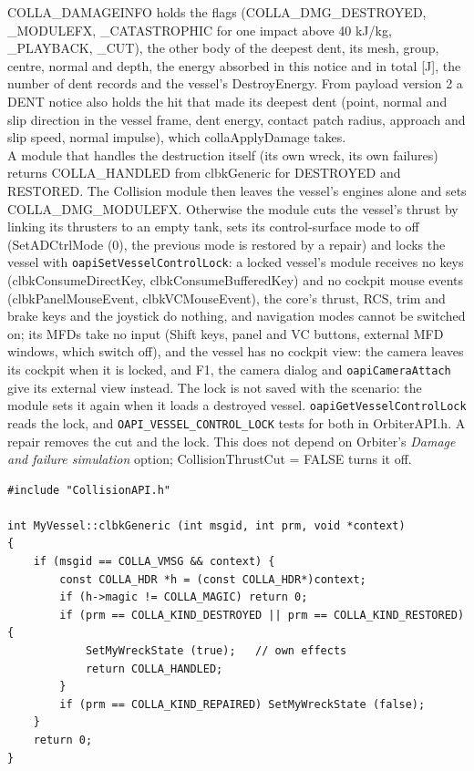 \documentclass[Orbiter Developer Manual.tex]{subfiles}
\begin{document}
\begin{sloppypar}
\noindent
COLLA\_DAMAGEINFO holds the flags (COLLA\_DMG\_DESTROYED, \_MODULEFX, \_CATASTROPHIC for one impact above 40 kJ/kg, \_PLAYBACK, \_CUT), the other body of the deepest dent, its mesh, group, centre, normal and depth, the energy absorbed in this notice and in total [J], the number of dent records and the vessel's DestroyEnergy. From payload version 2 a DENT notice also holds the hit that made its deepest dent (point, normal and slip direction in the vessel frame, dent energy, contact patch radius, approach and slip speed, normal impulse), which collaApplyDamage takes.\\
A module that handles the destruction itself (its own wreck, its own failures) returns COLLA\_HANDLED from clbkGeneric for DESTROYED and RESTORED. The Collision module then leaves the vessel's engines alone and sets COLLA\_DMG\_MODULEFX. Otherwise the module cuts the vessel's thrust by linking its thrusters to an empty tank, sets its control-surface mode to off (SetADCtrlMode (0), the previous mode is restored by a repair) and locks the vessel with \texttt{oapiSetVesselControlLock}: a locked vessel's module receives no keys (clbkConsumeDirectKey, clbkConsumeBufferedKey) and no cockpit mouse events (clbkPanelMouseEvent, clbkVCMouseEvent), the core's thrust, RCS, trim and brake keys and the joystick do nothing, and navigation modes cannot be switched on; its MFDs take no input (Shift keys, panel and VC buttons, external MFD windows, which switch off), and the vessel has no cockpit view: the camera leaves its cockpit when it is locked, and F1, the camera dialog and \texttt{oapiCameraAttach} give its external view instead. The lock is not saved with the scenario: the module sets it again when it loads a destroyed vessel. \texttt{oapiGetVesselControlLock} reads the lock, and \texttt{OAPI\_VESSEL\_CONTROL\_LOCK} tests for both in OrbiterAPI.h. A repair removes the cut and the lock. This does not depend on Orbiter's \textit{Damage and failure simulation} option; CollisionThrustCut = FALSE turns it off.

\begin{lstlisting}
#include "CollisionAPI.h"

int MyVessel::clbkGeneric (int msgid, int prm, void *context)
{
    if (msgid == COLLA_VMSG && context) {
        const COLLA_HDR *h = (const COLLA_HDR*)context;
        if (h->magic != COLLA_MAGIC) return 0;
        if (prm == COLLA_KIND_DESTROYED || prm == COLLA_KIND_RESTORED) {
            SetMyWreckState (true);   // own effects
            return COLLA_HANDLED;
        }
        if (prm == COLLA_KIND_REPAIRED) SetMyWreckState (false);
    }
    return 0;
}
\end{lstlisting}



\end{sloppypar}
\end{document}

